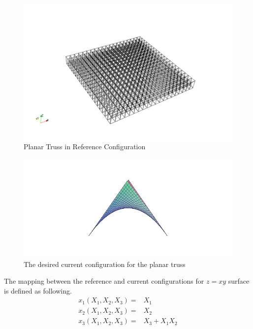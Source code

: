 \begin{figure} 
\centering
\includegraphics[width=5.0in]{./chap_5_active_trusses/images_space_filler/planar_truss_ref_config.png}
\caption{Planar Truss in Reference Configuration}
\label{fig:planar_truss_ref_config}
\end{figure}

\begin{figure} 
\centering
\includegraphics[width=5.0in]{./chap_5_active_trusses/images_space_filler/xy_plane_desired_shape.jpg}
\caption{The desired current configuration for the planar truss}
\label{fig:xy_plane_desired_shape}
\end{figure}

The mapping between the reference and current configurations for $z=xy$ surface is defined as following.
\begin{equation}
\begin{aligned}
x_1(X_1,X_2,X_3) = & X_1 \\
x_2(X_1,X_2,X_3) = & X_2 \\
x_3(X_1,X_2,X_3) = & X_3+X_1 X_2 \\
\end{aligned}
\label{doubly_curved_mapping:eqn}
\end{equation}

